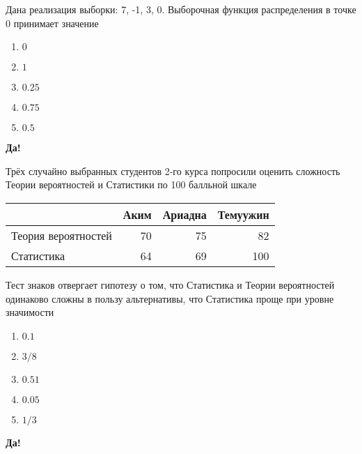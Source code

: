 \documentclass[t]{beamer}
\begin{document}
 \begin{frame} \label{45-Yes} 
\begin{block}{45} 

Дана реализация выборки: 7, -1, 3, 0.  Выборочная функция распределения в точке 0 принимает значение


 \end{block} 
\begin{enumerate} 
\item[] \hyperlink{45-No}{\beamergotobutton{} $0$}
\item[] \hyperlink{45-No}{\beamergotobutton{} $1$}
\item[] \hyperlink{45-No}{\beamergotobutton{} $0.25$}
\item[] \hyperlink{45-No}{\beamergotobutton{} $0.75$}
\item[] \hyperlink{45-Yes}{\beamergotobutton{} $0.5$}
\end{enumerate} 

 \textbf{Да!} 
 \hyperlink{46}{}\end{frame} 


 \begin{frame} \label{46-Yes} 
\begin{block}{46} 

Трёх случайно выбранных студентов 2-го курса попросили оценить сложность Теории вероятностей и Статистики по 100 балльной шкале

\vspace{5mm}
\begin{tabular}{lrrr}
  \toprule
   & Аким & Ариадна & Темуужин \\
   \midrule
   Теория вероятностей & 70 & 75 & 82 \\
   Статистика & 64 & 69 & 100 \\
  \bottomrule
\end{tabular}
\vspace{5mm}


Тест знаков отвергает гипотезу о том, что Статистика и Теории вероятностей одинаково сложны в пользу альтернативы, что Статистика проще при уровне значимости


 \end{block} 
\begin{enumerate} 
\item[] \hyperlink{46-No}{\beamergotobutton{} $0.1$}
\item[] \hyperlink{46-No}{\beamergotobutton{} $3/8$}
\item[] \hyperlink{46-Yes}{\beamergotobutton{} $0.51$}
\item[] \hyperlink{46-No}{\beamergotobutton{} $0.05$}
\item[] \hyperlink{46-No}{\beamergotobutton{} $1/3$}
\end{enumerate} 

 \textbf{Да!} 
 \hyperlink{47}{}\end{frame} 
\end{document}
